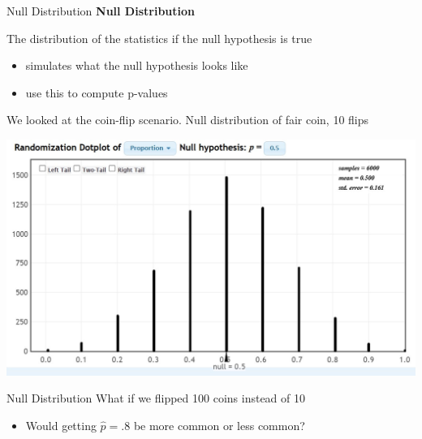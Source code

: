 \documentclass{beamer}
\begin{document}
\begin{frame}{Null Distribution}
\textbf{Null Distribution} 

The distribution of the statistics if the null hypothesis is true
\begin{itemize}
    \item simulates what the null hypothesis looks like
    \item use this to compute p-values
\end{itemize} \vspace{2mm}

We looked at the coin-flip scenario. Null distribution of fair coin, 10 flips

\begin{center}
    \includegraphics[scale=.42]{img/coin_null_distr.jpg}
\end{center}

\end{frame}

\begin{frame}{Null Distribution}
What if we flipped 100 coins instead of 10
\begin{itemize}
    \item Would getting $\hat{p} = .8$ be more common or less common?
\end{itemize}
\end{frame}
\end{document}
